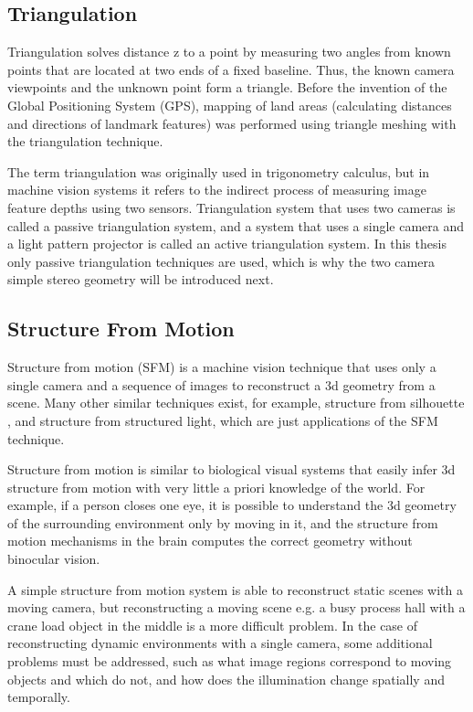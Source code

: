 \documentclass[12pt,a4paper,oneside,pdftex]{report}
\begin{document}
{\subsection{Triangulation}
\label{subsection:triangulation}

Triangulation solves distance z to a point by measuring two angles from known points that are located at two ends of a fixed baseline. Thus, the known camera viewpoints and the unknown point form a triangle. Before the invention of the Global Positioning System (GPS), mapping of land areas (calculating distances and directions of landmark features) was performed using triangle meshing with the triangulation technique.

The term triangulation was originally used in trigonometry calculus, but in machine vision systems it refers to the indirect process of measuring image feature depths using two sensors. Triangulation system that uses two cameras is called a passive triangulation system, and a system that uses a single camera and a light pattern projector is called an active triangulation system. In this thesis only passive triangulation techniques are used, which is why the two camera simple stereo geometry will be introduced next.

\subsection{Structure From Motion}
\label{subsection:structure_from_motion}

Structure from motion (SFM) is a machine vision technique that uses only a single camera and a sequence of images to  reconstruct a 3d geometry from a scene. Many other similar techniques exist, for example, structure from silhouette
, and structure from structured light, which are just applications of the SFM technique.

Structure from motion is similar to biological visual systems that easily infer 3d structure from motion with very little a priori knowledge of the world. For example, if a person closes one eye, it is possible to understand the 3d geometry of the surrounding environment only by moving in it, and the structure from motion mechanisms in the brain computes the correct geometry without binocular vision.

A simple structure from motion system is able to reconstruct static scenes with a moving camera, but reconstructing a moving scene e.g. a busy process hall with a crane load object in the middle is a more difficult problem. In the case of reconstructing dynamic environments with a single camera, some additional problems must be addressed, such as what image regions correspond to moving objects and which do not, and how does the illumination change spatially and temporally.

}
\end{document}
